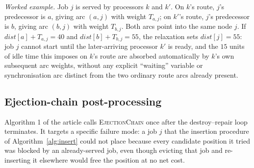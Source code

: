 \documentclass[11pt]{article}
\begin{document}
\emph{Worked example.} Job $j$ is served by processors $k$ and $k'$. On $k$'s route, $j$'s predecessor is $a$, giving arc $(a, j)$ with weight $T_{a,j}$; on $k'$'s route, $j$'s predecessor is $b$, giving arc $(b, j)$ with weight $T_{b,j}$. Both arcs point into the same node $j$. If $\textit{dist}[a] + T_{a,j} = 40$ and $\textit{dist}[b] + T_{b,j} = 55$, the relaxation sets $\textit{dist}[j] = 55$: job $j$ cannot start until the later-arriving processor $k'$ is ready, and the $15$ units of idle time this imposes on $k$'s route are absorbed automatically by $k$'s own subsequent arc weights, without any explicit ``waiting'' variable or synchronisation arc distinct from the two ordinary route arcs already present.

\subsection{Ejection-chain post-processing}

Algorithm 1 of the article calls \textsc{EjectionChain} once after the destroy--repair loop terminates. It targets a specific failure mode: a job $j$ that the insertion procedure of Algorithm~\ref{alg:insert} could not place because every candidate position it tried was blocked by an already-served job, even though evicting that job and re-inserting it elsewhere would free the position at no net cost.
\end{document}
